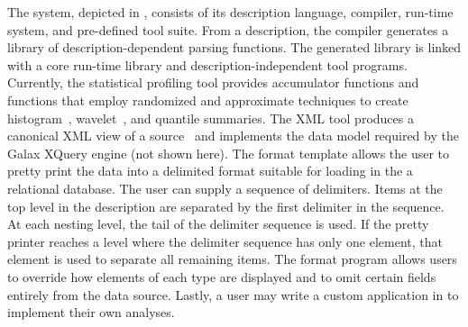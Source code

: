The \pads{} system, depicted in , consists of its
description language, compiler, run-time system, and pre-defined tool
suite.  From a description, the compiler generates a library of
description-dependent parsing functions.  The generated library is
linked with a core run-time library and description-independent tool
programs.  Currently, the statistical profiling tool provides
accumulator functions and functions that employ randomized and
approximate techniques to create histogram~\cite{histograms},
wavelet~\cite{histograms-wavelets}, and quantile
summaries\cite{quantiles}.  The XML tool produces a canonical XML view
of a \pads{} source~\cite{fernandez+:padx} and implements the data
model required by the Galax XQuery engine (not shown here).
The format template allows the user to pretty print the data into a  
delimited format suitable for loading in the a relational database.   
The user can supply a sequence of delimiters.  Items at the top level  
in the description are separated by the first delimiter in the  
sequence.  At each nesting level, the tail of the delimiter sequence  
is used.  If the pretty printer reaches a level where the delimiter  
sequence has only one element, that element is used to separate all  
remaining items.  The format program allows users to override how  
elements of each type are displayed and to omit certain fields  
entirely from the data source.
Lastly, a user may write a custom
application in \C{} to implement their own analyses.

